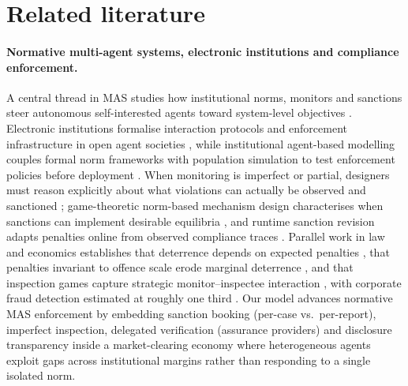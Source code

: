 \documentclass[11pt]{article}
\begin{document}
\section{Related literature}\label{sec:literature}

\paragraph{Normative multi-agent systems, electronic institutions and compliance enforcement.}
A central thread in MAS studies how institutional norms, monitors and sanctions steer autonomous self-interested agents toward system-level objectives \citep{boella2006introduction}. Electronic institutions formalise interaction protocols and enforcement infrastructure in open agent societies \citep{arcos2005engineering}, while institutional agent-based modelling couples formal norm frameworks with population simulation to test enforcement policies before deployment \citep{balke2013iabm}. When monitoring is imperfect or partial, designers must reason explicitly about what violations can actually be observed and sanctioned \citep{alechina2014norm}; game-theoretic norm-based mechanism design characterises when sanctions can implement desirable equilibria \citep{bulling2016norm}, and runtime sanction revision adapts penalties online from observed compliance traces \citep{dellanna2020runtime}. Parallel work in law and economics establishes that deterrence depends on expected penalties \citep{becker1968crime}, that penalties invariant to offence scale erode marginal deterrence \citep{stigler1970optimum,mookherjee1994marginal}, and that inspection games capture strategic monitor--inspectee interaction \citep{avenhaus2002inspection}, with corporate fraud detection estimated at roughly one third \citep{dyck2024pervasive}. Our model advances normative MAS enforcement by embedding sanction booking (per-case vs.\ per-report), imperfect inspection, delegated verification (assurance providers) and disclosure transparency inside a market-clearing economy where heterogeneous agents exploit gaps across institutional margins rather than responding to a single isolated norm.
\end{document}
